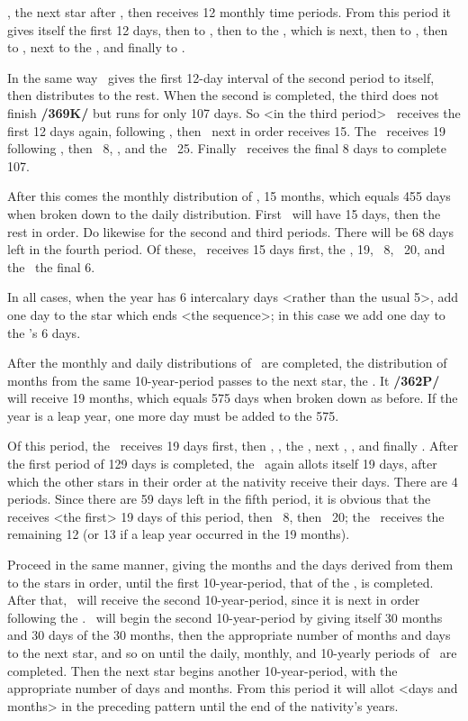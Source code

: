 \Jupiter, the next star after \Saturn, then receives 12 monthly time periods. From this period it gives itself the first 12 days, then to \Mars, then to the \Sun, which is next, then to \Venus, then to \Mercury, next to the \Moon, and finally to \Saturn. 

In the same way \Jupiter\, gives the first 12-day interval of the second
period to itself, then distributes to the rest. When the second is completed, the third does not finish \textbf{/369K/} but runs for only 107 days. So <in the third period> \Jupiter\, receives the first 12 days again, following \Saturn, then \Mars\, next in order receives 15. The \Sun\, receives 19 following \Mars, then \Venus\, 8, , and the \Moon\, 25. Finally \Saturn\, receives the final 8 days to complete 107.

After this comes the monthly distribution of \Mars, 15 months, which equals 455 days when broken down to the daily distribution. First \Mars\, will have 15 days, then the rest in order. Do likewise for the
second and third periods. There will be 68 days left in the fourth period. Of these, \Mars\, receives 15 days first, the \Sun, 19, \Venus\, 8, \Mercury\, 20, and the \Moon\, the final 6. 

In all cases, when the year has 6 intercalary days <rather than the usual 5>, add one day to the star which ends <the sequence>; in this case we add one day to the \Moon’s 6 days.

After the monthly and daily distributions of \Mars\, are completed, the distribution of months from the same 10-year-period passes to the next star, the \Sun. It \textbf{/362P/} will receive 19 months, which equals 575 days when broken down as before. If the year is a leap year, one more day must be added to the 575. 

Of this period, the \Sun\, receives 19 days first, then \Venus, \Mercury, the \Moon, next \Saturn, \Jupiter, and finally \Mars. After the first period of 129 days is completed, the \Sun\, again allots itself 19 days, after which the other stars in their order at the nativity receive their days. There are 4 periods. Since there are 59 days left in the fifth period, it is obvious that the \Sun\, receives <the first> 19 days of this period, then \Venus\, 8, then \Mercury\, 20; the \Moon\, receives the remaining 12 (or 13 if a leap year occurred in the 19 months).

Proceed in the same manner, giving the months and the days derived from them to the stars in order, until the first 10-year-period, that of the \Moon, is completed. After that, \Saturn\, will receive the second 10-year-period, since it is next in order following the \Moon. \Saturn\, will begin the second 10-year-period by giving itself 30 months and 30 days of the 30 months, then the appropriate number of months and days to the next star, and so on until the daily, monthly, and 10-yearly periods of \Saturn\, are completed. Then the next star begins another 10-year-period, with the appropriate number of days and months. From this period it will allot <days and months> in the preceding pattern until the end of the nativity’s years. 


